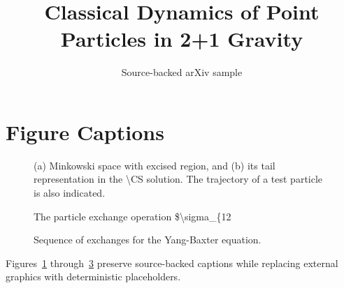 \documentclass[11pt]{article}
\title{Classical Dynamics of Point Particles in 2+1 Gravity}
\author{Source-backed arXiv sample}
\date{}
\begin{document}
\maketitle
\section{Figure Captions}

\begin{figure}[htbp]
\centering
\fbox{\rule{0pt}{1.15in}\rule{0.78\linewidth}{0pt}}
\caption{(a) Minkowski space with excised region, and (b) its tail representation in the \textbackslash{}CS solution. The trajectory of a test particle is also indicated.}
\label{fig:source-1}
\end{figure}


\begin{figure}[htbp]
\centering
\fbox{\rule{0pt}{1.15in}\rule{0.78\linewidth}{0pt}}
\caption{The particle exchange operation \$\textbackslash{}sigma\_\{12}
\label{fig:source-2}
\end{figure}


\begin{figure}[htbp]
\centering
\fbox{\rule{0pt}{1.15in}\rule{0.78\linewidth}{0pt}}
\caption{Sequence of exchanges for the Yang-Baxter equation.}
\label{fig:source-3}
\end{figure}


Figures~\ref{fig:source-1} through~\ref{fig:source-3} preserve source-backed captions while replacing external graphics with deterministic placeholders.
\end{document}

